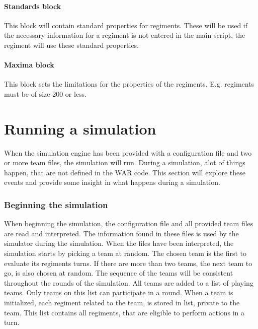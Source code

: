 		\paragraph{Standards block}
		This block will contain standard properties for regiments. These will be used if the necessary 
		information for a regiment is not entered in the main script, the regiment will use these standard properties.
		
		\paragraph{Maxima block}
		This block sets the limitations for the properties of the regiments. E.g. regiments must be of size 200 or less.

\section{ Running a simulation }
	When the simulation engine has been provided with a configuration file and two or more team files, the simulation will run. During a simulation, alot of things happen, that are not defined in the WAR code. This section will explore these events and provide some insight in what happens during a simulation.
		\subsubsection{Beginning the simulation}
		When beginning the simulation, the configuration file and all provided team files are read and interpreted. The information found in these files is used by the simulator during the simulation. When the files have been interpreted, the simulation starts by picking a team at random. The chosen team is the first to evaluate its regiments turns. If there are more than two teams, the next team to go, is also chosen at random. The sequence of the teams will be consistent throughout the rounds of the simulation. All teams are added to a list of playing teams. Only teams on this list can participate in a round. When a team is initialized, each regiment related to the team, is stored in list, private to the team. This list contains all regiments, that are eligible to perform actions in a turn. 
